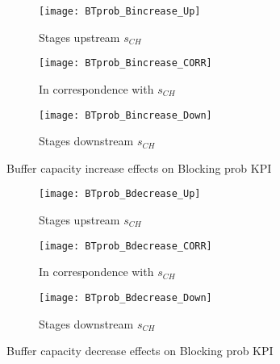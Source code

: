 \begin{landscape}
\begin{figure}[p]
  \centering
  \begin{subfigure}[t]{0.4\textwidth}
    \texttt{[image: BTprob\_Bincrease\_Up]}
    \caption{Stages upstream $s_{CH}$}
    \label{fig:Buffer capacity increase effects on Blocking prob KPI - Stages upstream}   
  \end{subfigure}
  \begin{subfigure}[t]{0.4\textwidth}
    \texttt{[image: BTprob\_Bincrease\_CORR]}
    \caption{In correspondence with $s_{CH}$}
    \label{fig:Buffer capacity increase effects on Blocking prob KPI - In correspondence with}   
  \end{subfigure}
  \begin{subfigure}[t]{0.4\textwidth}
    \texttt{[image: BTprob\_Bincrease\_Down]}
    \caption{Stages downstream $s_{CH}$}
    \label{fig:Buffer capacity increase effects on Blocking prob KPI - Stages downstream}   
  \end{subfigure}
  \caption{Buffer capacity increase effects on Blocking prob KPI}
  \label{fig:Buffer capacity increase effects on Blocking prob KPI}
\end{figure}
\begin{figure}[p]
  \centering
  \begin{subfigure}[b]{0.4\textwidth}
    \texttt{[image: BTprob\_Bdecrease\_Up]}
    \caption{Stages upstream $s_{CH}$}
    \label{fig:Buffer capacity decrease effects on Blocking prob KPI - Stages upstream}   
  \end{subfigure}
  \begin{subfigure}[b]{0.4\textwidth}
    \texttt{[image: BTprob\_Bdecrease\_CORR]}
    \caption{In correspondence with $s_{CH}$}
    \label{fig:Buffer capacity decrease effects on Blocking prob KPI - In correspondence with}   
  \end{subfigure}
  \begin{subfigure}[b]{0.4\textwidth}
    \texttt{[image: BTprob\_Bdecrease\_Down]}
    \caption{Stages downstream $s_{CH}$}
    \label{fig:Buffer capacity decrease effects on Blocking prob KPI - Stages downstream}   
  \end{subfigure}
  \caption{Buffer capacity decrease effects on Blocking prob KPI}
  \label{fig:Buffer capacity decrease effects on Blocking prob KPI}
\end{figure}
\end{landscape}
